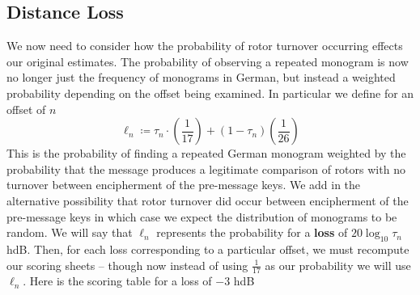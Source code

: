 \subsection{Distance Loss}
We now need to consider how the probability of rotor turnover
occurring effects our original estimates. The probability of
observing a repeated monogram is now no longer just the frequency
of monograms in German, but instead a weighted probability
depending on the offset being examined. In particular we define for
an offset of $n$
\[
	\ell_n \coloneq \tau_n\cdot(\frac{1}{17}) + (1-\tau_n)(\frac{1}{26})
\]
This is the probability of finding a repeated German monogram
weighted by the probability that the message produces a legitimate
comparison of rotors with no turnover between encipherment of the
pre-message keys. We add in the alternative possibility that rotor
turnover did occur between encipherment of the pre-message keys in
which case we expect the distribution of monograms to be random. We
will say that $\ell_n$ represents the probability for a {\bf{loss}}
of $20\log_{10}{\tau_n}$ hdB. Then, for each loss corresponding to
a particular offset, we must recompute our scoring sheets -- though
now instead of using $\frac{1}{17}$ as our probability we will use
$\ell_n$. Here is the scoring table for a loss of $-3$ hdB
